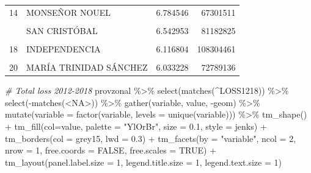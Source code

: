 \documentclass[10pt,landscape,a3paper]{article}
\newenvironment{Shaded}{\begin{snugshade}}{\end{snugshade}}
\newcommand{\AttributeTok}[1]{\textcolor[rgb]{0.77,0.63,0.00}{#1}}
\newcommand{\CommentTok}[1]{\textcolor[rgb]{0.56,0.35,0.01}{\textit{#1}}}
\newcommand{\ConstantTok}[1]{\textcolor[rgb]{0.00,0.00,0.00}{#1}}
\newcommand{\DecValTok}[1]{\textcolor[rgb]{0.00,0.00,0.81}{#1}}
\newcommand{\FloatTok}[1]{\textcolor[rgb]{0.00,0.00,0.81}{#1}}
\newcommand{\FunctionTok}[1]{\textcolor[rgb]{0.00,0.00,0.00}{#1}}
\newcommand{\NormalTok}[1]{#1}
\newcommand{\SpecialCharTok}[1]{\textcolor[rgb]{0.00,0.00,0.00}{#1}}
\newcommand{\StringTok}[1]{\textcolor[rgb]{0.31,0.60,0.02}{#1}}
\begin{document}
\begin{table}[H]
\begin{tabular}[t]{llrr}
14 & MONSEÑOR NOUEL & 6.784546 & 67301511\\
\cellcolor{lightgray}{15} & \cellcolor{lightgray}{SAN JUAN} & \cellcolor{lightgray}{6.560149} & \cellcolor{lightgray}{220712371}\\
\addlinespace
16 & SAN CRISTÓBAL & 6.542953 & 81182825\\
\cellcolor{lightgray}{17} & \cellcolor{lightgray}{SANTIAGO} & \cellcolor{lightgray}{6.289643} & \cellcolor{lightgray}{176542269}\\
18 & INDEPENDENCIA & 6.116804 & 108304461\\
\cellcolor{lightgray}{19} & \cellcolor{lightgray}{ESPAILLAT} & \cellcolor{lightgray}{6.052755} & \cellcolor{lightgray}{50958817}\\
20 & MARÍA TRINIDAD SÁNCHEZ & 6.033228 & 72789136\\
\bottomrule
\end{tabular}
\end{table}

\begin{Shaded}
\begin{Highlighting}[]

\CommentTok{\# Total loss 2012{-}2018}
\NormalTok{provzonal }\SpecialCharTok{\%\textgreater{}\%} \FunctionTok{select}\NormalTok{(}\FunctionTok{matches}\NormalTok{(}\StringTok{\textquotesingle{}\^{}LOSS1218\textquotesingle{}}\NormalTok{)) }\SpecialCharTok{\%\textgreater{}\%} \FunctionTok{select}\NormalTok{(}\SpecialCharTok{{-}}\FunctionTok{matches}\NormalTok{(}\StringTok{\textquotesingle{}\textless{}NA\textgreater{}\textquotesingle{}}\NormalTok{)) }\SpecialCharTok{\%\textgreater{}\%} 
  \FunctionTok{gather}\NormalTok{(variable, value, }\SpecialCharTok{{-}}\NormalTok{geom) }\SpecialCharTok{\%\textgreater{}\%}
  \FunctionTok{mutate}\NormalTok{(}\AttributeTok{variable =} \FunctionTok{factor}\NormalTok{(variable, }\AttributeTok{levels =} \FunctionTok{unique}\NormalTok{(variable))) }\SpecialCharTok{\%\textgreater{}\%} 
  \FunctionTok{tm\_shape}\NormalTok{() }\SpecialCharTok{+}
    \FunctionTok{tm\_fill}\NormalTok{(}\AttributeTok{col=}\StringTok{\textquotesingle{}value\textquotesingle{}}\NormalTok{, }\AttributeTok{palette =} \StringTok{"YlOrBr"}\NormalTok{, }\AttributeTok{size =} \FloatTok{0.1}\NormalTok{, }\AttributeTok{style =} \StringTok{\textquotesingle{}jenks\textquotesingle{}}\NormalTok{) }\SpecialCharTok{+}
    \FunctionTok{tm\_borders}\NormalTok{(}\AttributeTok{col =} \StringTok{\textquotesingle{}grey15\textquotesingle{}}\NormalTok{, }\AttributeTok{lwd =} \FloatTok{0.3}\NormalTok{) }\SpecialCharTok{+}
    \FunctionTok{tm\_facets}\NormalTok{(}\AttributeTok{by =} \StringTok{"variable"}\NormalTok{, }\AttributeTok{ncol =} \DecValTok{2}\NormalTok{, }\AttributeTok{nrow =} \DecValTok{1}\NormalTok{, }\AttributeTok{free.coords =} \ConstantTok{FALSE}\NormalTok{, }\AttributeTok{free.scales =} \ConstantTok{TRUE}\NormalTok{) }\SpecialCharTok{+}
    \FunctionTok{tm\_layout}\NormalTok{(}\AttributeTok{panel.label.size =} \DecValTok{1}\NormalTok{, }\AttributeTok{legend.title.size =} \DecValTok{1}\NormalTok{, }\AttributeTok{legend.text.size =} \DecValTok{1}\NormalTok{)}
\end{Highlighting}
\end{Shaded}
\end{document}
